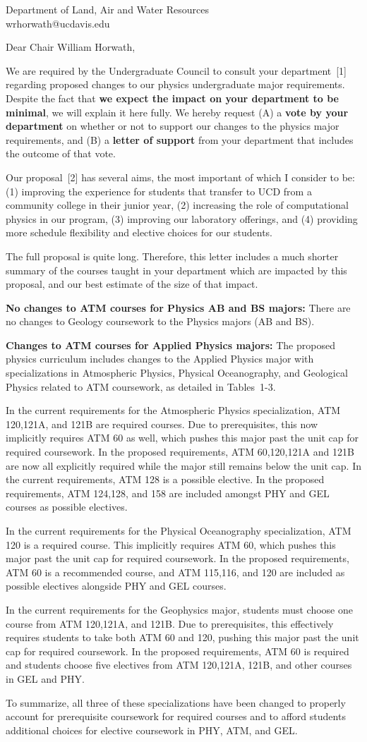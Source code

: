\documentclass[letterpaper,12pt]{letter}
\def\letterparta{
We are required by the Undergraduate Council to consult your
department~[1] regarding proposed changes to our physics undergraduate major requirements.  Despite the fact that {\bf we expect the
  impact on your department to be minimal}, we will explain it here
fully.  We hereby request (A) a {\bf vote by your department} on
whether or not to support our changes to the physics major
requirements, and (B) a {\bf letter of support} from your department
that includes the outcome of that vote.

Our proposal~[2] has several aims, the most important of which I
consider to be: (1) improving the experience for students that
transfer to UCD from a community college in their junior year, (2)
increasing the role of computational physics in our program, (3)
improving our laboratory offerings, and (4) providing more schedule
flexibility and elective choices for our students.

The full proposal is quite long.  Therefore, this letter includes a
much shorter summary of the courses taught in your department which
are impacted by this proposal, and our best estimate of the size of
that impact.
}
\begin{document}
\begin{letter}{Department of Land, Air and Water Resources \\ wrhorwath@ucdavis.edu}
  
\opening{Dear Chair William Horwath,}

\letterparta

{\bf No changes to ATM courses for Physics AB and BS majors:} There
are no changes to Geology coursework to the Physics majors (AB and
BS).

{\bf Changes to ATM courses for Applied Physics majors:} The proposed
physics curriculum includes changes to the Applied Physics major with
specializations in Atmospheric Physics, Physical Oceanography, and
Geological Physics related to ATM coursework, as detailed in
Tables~1-3.

In the current requirements for the Atmospheric Physics
specialization, ATM 120,121A, and 121B are required courses.  Due to
prerequisites, this now implicitly requires ATM 60 as well, which
pushes this major past the unit cap for required coursework.  In the
proposed requirements, ATM 60,120,121A and 121B are now all explicitly
required while the major still remains below the unit cap.  In the
current requirements, ATM 128 is a possible elective.  In the proposed
requirements, ATM 124,128, and 158 are included amongst PHY and GEL
courses as possible electives.

In the current requirements for the Physical Oceanography
specialization, ATM 120 is a required course.  This implicitly
requires ATM 60, which pushes this major past the unit cap for
required coursework.  In the proposed requirements, ATM 60 is a
recommended course, and ATM 115,116, and 120 are included as possible
electives alongside PHY and GEL courses.

In the current requirements for the Geophysics major, students must
choose one course from ATM 120,121A, and 121B.  Due to prerequisites,
this effectively requires students to take both ATM 60 and 120, 
pushing this major past the unit cap for required coursework.  In the
proposed requirements, ATM 60 is required and students choose five
electives from ATM 120,121A, 121B, and other courses in GEL and PHY.

To summarize, all three of these specializations have been changed to
properly account for prerequisite coursework for required courses and
to afford students additional choices for elective coursework in PHY,
ATM, and GEL.


\end{letter}
\end{document}
